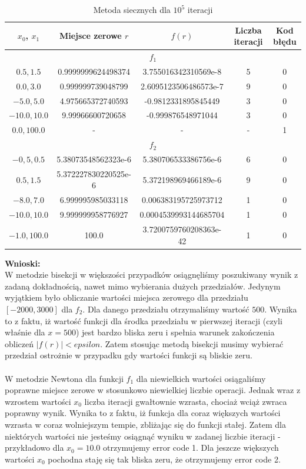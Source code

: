 \documentclass[12pt]{article}
\begin{document}
\begin{table}[h!]
	\centering
    \label{tab:table5}
    \begin{tabular}{c|c|c|c|c}
		$x_0$, $x_1$ & Miejsce zerowe $r$ & $f(r)$ & Liczba iteracji & Kod błędu \\
 		\hline
 		\hline
 		\multicolumn{5}{c}{$f_1$}\\
 		\hline
 		\hline
		$0.5, 1.5$ & 0.9999999624498374 & 3.755016342310569e-8 & 5 & 0\\
		\hline
		$0.0, 3.0$ & 0.999999739048799 & 2.6095123506486573e-7 & 9 & 0\\
		\hline
		$-5.0, 5.0$ & 4.975665372740593 & -0.9812331895845449 & 3 & 0\\
		\hline
		$-10.0, 10.0$ &9.99966600720658 & -0.999876548971044 & 3 & 0\\
		\hline
		$0.0, 100.0$ & - & - & - & 1 \\
		\hline
		\hline
 		\multicolumn{5}{c}{$f_2$}\\
 		\hline
 		\hline
 		$-0,5, 0.5$ & 5.38073548562323e-6 & 5.380706533386756e-6 & 6 & 0\\
 		\hline
 		$0.5, 1.5$ & 5.372227830220525e-6 & 5.372198969466189e-6 & 9 & 0\\
 		\hline
 		$-8.0, 7.0$ & 6.999995985033118 & 0.006383195725973712 & 1 & 0\\
 		\hline
 		$-10.0, 10.0$ & 9.999999958776927 & 0.0004539993144685704 & 1 & 0\\
 		\hline
 		$-1.0, 100.0$ & 100.0 & 3.7200759760208363e-42 & 1 & 0\\
 		\hline
    \end{tabular}
	\caption{Metoda siecznych dla $10^5$ iteracji}
\end{table}
\clearpage
\noindent \textbf{Wnioski:}\\
\indent W metodzie bisekcji w większości przypadków osiągnęliśmy poszukiwany wynik z zadaną dokładnością, nawet mimo wybierania dużych przedziałów. Jedynym wyjątkiem było obliczanie wartości miejsca zerowego dla przedziału $[-2000, 3000]$ dla $f_2$. Dla danego przedziału otrzymaliśmy wartość $500$. Wynika to z faktu, iż wartość funkcji dla środka przedziału w pierwszej iteracji (czyli właśnie dla $x=500$) jest bardzo bliska zeru i spełnia warunek zakończenia obliczeń $|f(r)| < epsilon$. Zatem stosując metodą bisekcji musimy wybierać przedział ostrożnie w przypadku gdy wartości funkcji są bliskie zeru.
\\
\\
\indent W metodzie Newtona dla funkcji $f_1$ dla niewielkich wartości osiągaliśmy poprawne miejsce zerowe w stosunkowo niewielkiej liczbie operacji. Jednak wraz z wzrostem wartości $x_0$ liczba iteracji gwałtownie wzrasta, chociaż wciąż zwraca poprawny wynik. Wynika to z faktu, iż funkcja dla coraz większych wartości wzrasta w coraz wolniejszym tempie, zbliżając się do funkcji stałej. Zatem dla niektórych wartości nie jesteśmy osiągnąć wyniku w zadanej liczbie iteracji - przykładowo dla $x_0 = 10.0$ otrzymujemy error code 1. Dla jeszcze większych wartości $x_0$ pochodna staję się tak bliska zeru, że otrzymujemy error code 2. 
\end{document}
